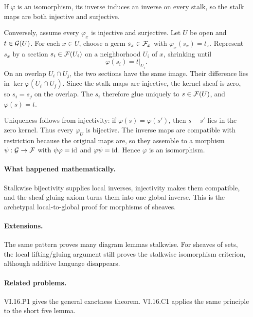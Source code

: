 \begin{solution}
If $\varphi$ is an isomorphism, its inverse induces an inverse on every stalk, so the stalk maps are both injective and surjective.

Conversely, assume every $\varphi_x$ is injective and surjective.  Let $U$ be open and $t\in\mathcal G(U)$.  For each $x\in U$, choose a germ $s_x\in\mathcal F_x$ with
$\varphi_x(s_x)=t_x$.  Represent $s_x$ by a section $s_i\in\mathcal F(U_i)$ on a neighborhood
$U_i$ of $x$, shrinking until
\[
\varphi(s_i)=t|_{U_i}.
\]
On an overlap $U_i\cap U_j$, the two sections have the same image.  Their difference lies in
$\ker\varphi(U_i\cap U_j)$.  Since the stalk maps are injective, the kernel sheaf is zero,
so $s_i=s_j$ on the overlap.  The $s_i$ therefore glue uniquely to $s\in\mathcal F(U)$, and
$\varphi(s)=t$.

Uniqueness follows from injectivity: if $\varphi(s)=\varphi(s')$, then $s-s'$ lies in the
zero kernel.  Thus every $\varphi_U$ is bijective.  The inverse maps are compatible with
restriction because the original maps are, so they assemble to a morphism
$\psi:\mathcal G\to\mathcal F$ with $\psi\varphi=\operatorname{id}$ and $\varphi\psi=\operatorname{id}$.  Hence $\varphi$ is an
isomorphism.
\end{solution}

\paragraph{What happened mathematically.}
Stalkwise bijectivity supplies local inverses, injectivity makes them compatible, and the sheaf gluing axiom turns them into one global inverse.  This is the archetypal local-to-global proof for morphisms of sheaves.

\paragraph{Extensions.}
The same pattern proves many diagram lemmas stalkwise.  For sheaves of sets, the local lifting/gluing argument still proves the stalkwise isomorphism criterion, although additive language disappears.

\paragraph{Related problems.}
VI.16.P1 gives the general exactness theorem.  VI.16.C1 applies the same principle to the short five lemma.
\fi

